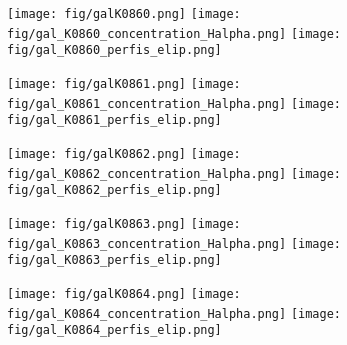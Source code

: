 \begin{figure}[!ht]
\begin{center}
\setcaptionmargin{1cm}
\texttt{[image: fig/galK0860.png]}
\texttt{[image: fig/gal\_K0860\_concentration\_Halpha.png]}
\texttt{[image: fig/gal\_K0860\_perfis\_elip.png]}
\end{center}
\end{figure}


\begin{figure}[!ht]
\begin{center}
\setcaptionmargin{1cm}
\texttt{[image: fig/galK0861.png]}
\texttt{[image: fig/gal\_K0861\_concentration\_Halpha.png]}
\texttt{[image: fig/gal\_K0861\_perfis\_elip.png]}
\end{center}
\end{figure}


\begin{figure}[!ht]
\begin{center}
\setcaptionmargin{1cm}
\texttt{[image: fig/galK0862.png]}
\texttt{[image: fig/gal\_K0862\_concentration\_Halpha.png]}
\texttt{[image: fig/gal\_K0862\_perfis\_elip.png]}
\end{center}
\end{figure}


\begin{figure}[!ht]
\begin{center}
\setcaptionmargin{1cm}
\texttt{[image: fig/galK0863.png]}
\texttt{[image: fig/gal\_K0863\_concentration\_Halpha.png]}
\texttt{[image: fig/gal\_K0863\_perfis\_elip.png]}
\end{center}
\end{figure}


\begin{figure}[!ht]
\begin{center}
\setcaptionmargin{1cm}
\texttt{[image: fig/galK0864.png]}
\texttt{[image: fig/gal\_K0864\_concentration\_Halpha.png]}
\texttt{[image: fig/gal\_K0864\_perfis\_elip.png]}
\end{center}
\end{figure}



